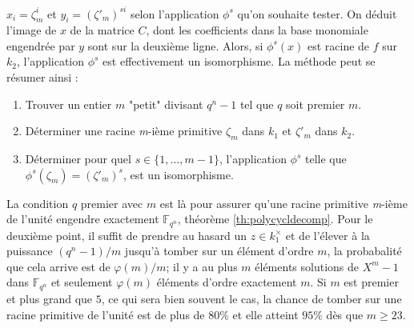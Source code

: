 \documentclass[a4paper]{article} %
\numberwithin{section}{part}
\numberwithin{equation}{section}
\newcommand\nroot[1]{\textit{#1}-ième}
\newcommand\GF[1]{\mathbb{F}_{#1}}
\begin{document}
$x_i = \zeta_m^i$ et $y_i = (\zeta'_m)^{si}$ selon l'application $\phi^s$ qu'on 
souhaite tester. On déduit l'image de $x$ de la matrice $C$, dont les 
coefficients dans la base monomiale engendrée par $y$ sont sur la deuxième 
ligne. Alors, si $\phi^s(x)$ est racine de $f$ sur $k_2$, l'application $\phi^s$
est effectivement un isomorphisme. La méthode peut se résumer ainsi :
\vspace{0.3cm}
\begin{enumerate}[1.]
\item Trouver un entier $m$ "petit" divisant $q^n - 1$ tel que 
$q$ soit premier $m$. 

\item Déterminer une racine \nroot{m} primitive $\zeta_m$ dans $k_1$ et
$\zeta'_m$ dans $k_2$.

\item  Déterminer pour quel $s\in \lbrace{1,\dots,m-1}\rbrace$, l'application
$\phi^s$ telle que $\phi^s(\zeta_m) = (\zeta'_m)^s$, est un isomorphisme.
\end{enumerate}
\vspace{0.3cm}
La condition $q$ premier avec $m$ est là pour assurer qu'une racine primitive
\nroot{m} de l'unité engendre exactement $\GF{q^n}$, théorème
\ref{th:polycycldecomp}. Pour le deuxième point, il suffit de prendre au hasard 
un $z\in k_1^{\times}$ et de l'élever à la puissance $(q^n - 1)/m$ jusqu'à 
tomber sur un élément d'ordre $m$, la probabalité que cela arrive est de 
$\varphi(m)/m$; il y a au plus $m$ éléments solutions de $X^m - 1$ dans 
$\GF{q^n}$ et seulement $\varphi(m)$ éléments d'ordre exactement $m$. Si $m$ est
premier et plus grand que $5$, ce qui sera bien souvent le cas, la chance de
tomber sur une racine primitive de l'unité est de plus de $80\%$ et elle atteint
$95\%$ dès que $m \geq 23$. 
\end{document}
